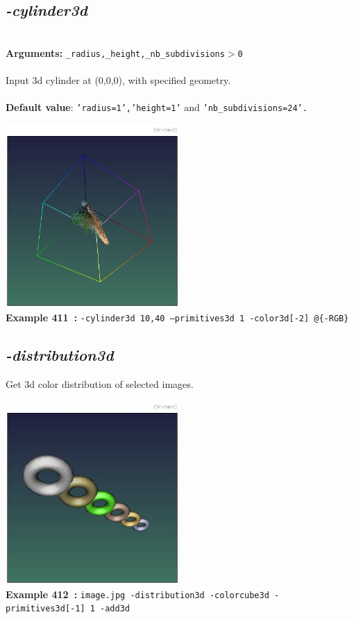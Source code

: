 \documentclass[a4paper,11pt,twoside]{book}
\begin{document}
\subsection{\emph{-cylinder3d} }\vspace*{-0.5em}
~\\\textbf{Arguments: } 
{\small \texttt{\_radius,\_height,\_nb\_subdivisions$>$0}}\\~\\
Input 3d cylinder at (0,0,0), with specified geometry.
~\\~\\\textbf{Default value}: {\small \texttt{'radius=1','height=1'} and \texttt{'nb\_subdivisions=24'.}}
\begin{center}\includegraphics[keepaspectratio=true,height=7cm,width=\textwidth]{img/gmic_def411.jpg}\\
{\footnotesize \textbf{Example 411~:} \texttt{-cylinder3d 10,40 --primitives3d 1 -color3d[-2] @\{-RGB\}}}
\end{center}

\subsection{\emph{-distribution3d} }\vspace*{-0.5em}
Get 3d color distribution of selected images.
\begin{center}\includegraphics[keepaspectratio=true,height=7cm,width=\textwidth]{img/gmic_def412.jpg}\\
{\footnotesize \textbf{Example 412~:} \texttt{image.jpg -distribution3d -colorcube3d -primitives3d[-1] 1 -add3d}}
\end{center}
\end{document}
